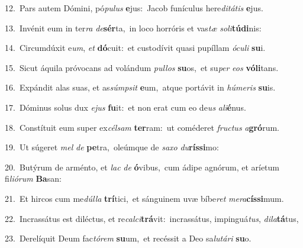 {\numbfont\textcolor{\numbcolor}{12.}}~Pars autem Dómini, pó\-\textit{pu}\-\textit{lus} \textbf{e}\-jus:~\star Jacob funículus here\-\textit{di}\-\textit{tá}\textit{tis} \textbf{e}\-jus.\par
{\numbfont\textcolor{\numbcolor}{13.}}~Invénit eum in ter\textit{ra} \textit{de}\-\textbf{sér}ta,~\star in loco horróris et vas\textit{tæ} \textit{so}\-\textit{li}\textbf{tú}\textbf{di}nis:\par
{\numbfont\textcolor{\numbcolor}{14.}}~Circumdúxit e\-\textit{um}\-, \textit{et} \textbf{dó}\-cuit:~\star et custodívit quasi pupíllam \textit{ó}\-\textit{cu}\textit{li} \textbf{su}\-i.\par
{\numbfont\textcolor{\numbcolor}{15.}}~Sicut áquila próvocans ad volándum \textit{pul}\-\textit{los} \textbf{su}\-os,~\star et su\textit{per} \textit{e}\-\textit{os} \textbf{vó}\-\textbf{li}tans.\par
{\numbfont\textcolor{\numbcolor}{16.}}~Expándit alas suas, et as\-\textit{súmp}\-\textit{sit} \textbf{e}\-um,~\star atque portávit in \textit{hú}\-\textit{me}\textit{ris} \textbf{su}\-is.\par
{\numbfont\textcolor{\numbcolor}{17.}}~Dóminus solus dux \textit{e}\-\textit{jus} \textbf{fu}\-it:~\star et non erat cum eo de\textit{us} \textit{a}\-\textit{li}\textbf{é}nus.\par
{\numbfont\textcolor{\numbcolor}{18.}}~Constítuit eum super ex\-\textit{cél}\-\textit{sam} \textbf{ter}\-ram:~\star ut coméderet \textit{fruc}\-\textit{tus} \textit{a}\-\textbf{gró}rum.\par
{\numbfont\textcolor{\numbcolor}{19.}}~Ut súgeret \textit{mel} \textit{de} \textbf{pe}\-tra,~\star oleúmque de \textit{sa}\-\textit{xo} \textit{du}\-\textbf{rís}\textbf{si}mo:\par
{\numbfont\textcolor{\numbcolor}{20.}}~Butýrum de arménto, et \textit{lac} \textit{de} \textbf{ó}\-vibus,~\star cum ádipe agnórum, et aríetum fi\-\textit{li}\-\textit{ó}\textit{rum} \textbf{Ba}\-san:\par
{\numbfont\textcolor{\numbcolor}{21.}}~Et hircos cum me\-\textit{dúl}\-\textit{la} \textbf{trí}\-tici,~\star et sánguinem uvæ bíbe\textit{ret} \textit{me}\-\textit{ra}\textbf{cís}\textbf{si}mum.\par
{\numbfont\textcolor{\numbcolor}{22.}}~Incrassátus est diléctus, et re\-\textit{cal}\-\textit{ci}\textbf{trá}vit:~\star incrassátus, impinguá\-\textit{tus}\-, \textit{di}\-\textit{la}\textbf{tá}tus,\par
{\numbfont\textcolor{\numbcolor}{23.}}~Derelíquit Deum fac\-\textit{tó}\-\textit{rem} \textbf{su}\-um,~\star et recéssit a Deo sa\-\textit{lu}\-\textit{tá}\textit{ri} \textbf{su}\-o.\par
